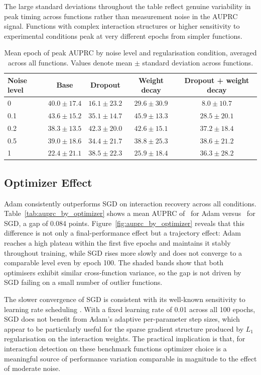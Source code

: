 \documentclass{article}
\begin{document}
The large standard deviations throughout the table reflect genuine variability
in peak timing across functions rather than measurement noise in the AUPRC
signal. Functions with complex interaction structures or higher sensitivity to
experimental conditions peak at very different epochs from simpler functions.

\begin{table}[htbp]
\centering
\begin{tabular}{lcccc}
\toprule
Noise level & Base & Dropout & Weight decay & Dropout + weight decay \\
\midrule
0   & $40.0 \pm 17.4$ & $16.1 \pm 23.2$ & $29.6 \pm 30.9$ & $8.0 \pm 10.7$ \\
0.1 & $43.6 \pm 15.2$ & $35.1 \pm 14.7$ & $45.9 \pm 13.3$ & $28.5 \pm 20.1$ \\
0.2 & $38.3 \pm 13.5$ & $42.3 \pm 20.0$ & $42.6 \pm 15.1$ & $37.2 \pm 18.4$ \\
0.5 & $39.0 \pm 18.6$ & $34.4 \pm 21.7$ & $38.8 \pm 25.3$ & $38.6 \pm 21.2$ \\
1   & $22.4 \pm 21.1$ & $38.5 \pm 22.3$ & $25.9 \pm 18.4$ & $36.3 \pm 28.2$ \\
\bottomrule
\end{tabular}
\caption{Mean epoch of peak AUPRC by noise level and regularisation
condition, averaged across all functions. Values denote mean $\pm$ standard
deviation across functions.}
\label{tab:peak_epoch}
\end{table}


\FloatBarrier
\subsection{Optimizer Effect}

Adam consistently outperforms SGD on interaction recovery across all conditions.
Table~\ref{tab:auprc_by_optimizer} shows a mean AUPRC of \statAdamMean\ for Adam
versus \statSGDMean\ for SGD, a gap of 0.084 points. Figure~\ref{fig:auprc_by_optimizer}
reveals that this difference is not only a final-performance effect but a
trajectory effect: Adam reaches a high plateau within the first five epochs and
maintains it stably throughout training, while SGD rises more slowly and does not
converge to a comparable level even by epoch 100. The shaded bands show that both
optimisers exhibit similar cross-function variance, so the gap is not driven by
SGD failing on a small number of outlier functions.

The slower convergence of SGD is consistent with its well-known sensitivity to
learning rate scheduling \citep{schaul2013peskylearningrates}. With a fixed learning rate of 0.01 across all 100
epochs, SGD does not benefit from Adam's adaptive per-parameter step sizes,
which appear to be particularly useful for the sparse gradient structure
produced by $L_1$ regularisation on the interaction weights. The practical
implication is that, for interaction detection on these benchmark functions 
optimizer choice is a meaningful source of
performance variation comparable in magnitude to the effect of moderate noise.
\end{document}
